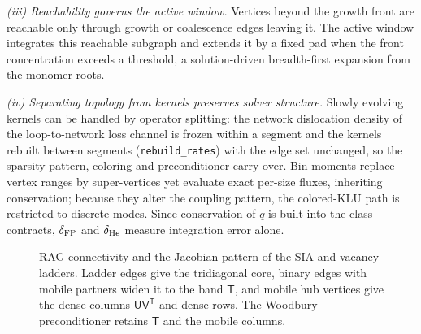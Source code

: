 \emph{(iii) Reachability governs the active window.} Vertices beyond the
growth front are reachable only through growth or coalescence edges
leaving it. The active window integrates this reachable subgraph and
extends it by a fixed pad when the front concentration exceeds a
threshold, a solution-driven breadth-first expansion from the monomer
roots.

\emph{(iv) Separating topology from kernels preserves solver structure.}
Slowly evolving kernels can be handled by operator splitting: the network
dislocation density of the loop-to-network loss channel is frozen within a
segment and the kernels rebuilt between segments (\texttt{rebuild\_rates})
with the edge set unchanged, so the sparsity pattern, coloring and
preconditioner carry over. Bin moments replace vertex ranges by
super-vertices yet evaluate exact per-size fluxes, inheriting
conservation; because they alter the coupling pattern, the colored-KLU
path is restricted to discrete modes. Since conservation of $q$ is built
into the class contracts, $\delta_{\rm FP}$ and $\delta_{\rm He}$ measure
integration error alone.

\begin{figure}[t]
\centering

\caption{RAG connectivity and the Jacobian pattern of the SIA and vacancy
ladders. Ladder edges give the tridiagonal core, binary edges with mobile
partners widen it to the band $\mathsf T$, and mobile hub vertices give
the dense columns $\mathsf U\mathsf V^{\mathsf T}$ and dense rows. The
Woodbury preconditioner retains $\mathsf T$ and the mobile columns.}
\label{fig:S1_jac}
\end{figure}
\endgroup
